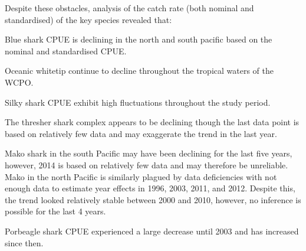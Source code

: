 Despite these obstacles, analysis of the catch rate (both nominal and standardised) of the key species revealed that:

Blue shark CPUE is declining in the north and south pacific based on the nominal and standardised CPUE.

Oceanic whitetip continue to decline throughout the tropical waters of the WCPO.

Silky shark CPUE exhibit high fluctuations throughout the study period.

The thresher shark complex appears to be declining though the last data point is based on relatively few data and may exaggerate the trend in the last year.

Mako shark in the south Pacific may have been declining for the last five years, however, 2014 is based on relatively few data and may therefore be unreliable. Mako in the north Pacific is similarly plagued by data deficiencies with not enough data to estimate year effects in 1996, 2003, 2011, and 2012. Despite this, the trend looked relatively stable between 2000 and 2010, however, no inference is possible for the last 4 years.%

Porbeagle shark CPUE experienced a large decrease until 2003 and has increased since then.




%